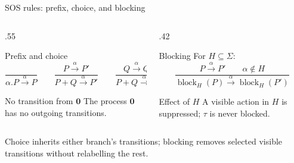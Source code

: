\documentclass[handout,aspectratio=169,11pt]{beamer}
\newcommand{\step}[1]{\xrightarrow{#1}}
\newcommand{\nil}{\mathbf 0}
\newcommand{\blockact}[2]{\operatorname{block}_{#1}(#2)}
\newcommand{\Takeaway}[1]{\begin{exampleblock}{}#1\end{exampleblock}}
\begin{document}
\begin{frame}{SOS rules: prefix, choice, and blocking}
  \begin{columns}[T,onlytextwidth]
    \begin{column}{.55\textwidth}
      \begin{block}{Prefix and choice}
        \[
          \frac{}{\alpha.P\step{\alpha}P}
          \qquad
          \frac{P\step{\alpha}P'}{P+Q\step{\alpha}P'}
          \qquad
          \frac{Q\step{\alpha}Q'}{P+Q\step{\alpha}Q'}
        \]
      \end{block}
      \begin{exampleblock}{No transition from $\nil$}
        The process $\nil$ has no outgoing transitions.
      \end{exampleblock}
    \end{column}
    \begin{column}{.42\textwidth}
      \begin{block}{Blocking}
        For $H\subseteq\Sigma$:
        \[
          \frac{P\step{\alpha}P'\qquad \alpha\notin H}
          {\blockact{H}{P}\step{\alpha}\blockact{H}{P'}}
        \]
      \end{block}
      \begin{exampleblock}{Effect of $H$}
        A visible action in $H$ is suppressed; $\tau$ is never blocked.
      \end{exampleblock}
    \end{column}
  \end{columns}
  \Takeaway{Choice inherits either branch's transitions; blocking removes selected visible transitions without relabelling the rest.}
\end{frame}
\end{document}
